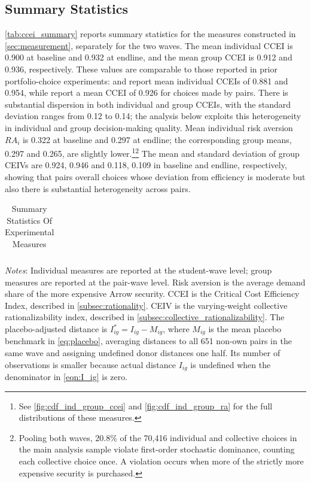 \documentclass[11 pt]{article}
\begin{document}
\subsection{Summary Statistics}
\autoref{tab:ccei_summary} reports summary statistics for the measures constructed in \autoref{sec:measurement}, separately for the two waves. The mean individual CCEI is 0.900 at baseline and 0.932 at endline, and the mean group CCEI is 0.912 and 0.936, respectively. These values are comparable to those reported in prior portfolio-choice experiments: \citet{Choietal:2007:AER} and \citet{Choietal:2014:AER} report mean individual CCEIs of 0.881 and 0.954, while \citet{GonzalezJimenezMueller2025SSRN} report a mean CCEI of 0.926 for choices made by pairs. There is substantial dispersion in both individual and group CCEIs, with the standard deviation ranges from 0.12 to 0.14; the analysis below exploits this heterogeneity in individual and group decision-making quality. Mean individual risk aversion $RA_{i}$ is 0.322 at baseline and 0.297 at endline; the corresponding group means, 0.297 and 0.265, are slightly lower.\footnote{See \autoref{fig:cdf_ind_group_ccei} and \autoref{fig:cdf_ind_group_ra} for the full distributions of these measures.}\footnote{Pooling both waves, 20.8\% of the 70,416 individual and collective choices in the main analysis sample violate first-order stochastic dominance, counting each collective choice once. A violation occurs when more of the strictly more expensive security is purchased.} The mean and standard deviation of group CEIVs are 0.924, 0.946 and 0.118, 0.109 in baseline and endline, respectively, showing that pairs overall choices whose deviation from efficiency is moderate but also there is substantial heterogeneity across pairs.

\begin{table}[h]
\centering
\caption{Summary Statistics Of Experimental Measures}
\label{tab:ccei_summary}
\begin{tabular}{lcccccc}
\toprule \hline

\end{tabular}
\begin{minipage}{\textwidth}
{\footnotesize \emph{Notes}: Individual measures are reported at the student-wave level; group measures are reported at the pair-wave level. Risk aversion is the average demand share of the more expensive Arrow security. CCEI is the Critical Cost Efficiency Index, described in \autoref{subsec:rationality}. CEIV is the varying-weight collective rationalizability index, described in \autoref{subsec:collective_rationalizability}. The placebo-adjusted distance is $I^*_{ig}=I_{ig}-M_{ig}$, where $M_{ig}$ is the mean placebo benchmark in \autoref{eq:placebo}, averaging distances to all 651 non-own pairs in the same wave and assigning undefined donor distances one half. Its number of observations is smaller because actual distance $I_{ig}$ is undefined when the denominator in \autoref{eqn:I_ig} is zero.}
\end{minipage}
\end{table}
\end{document}
